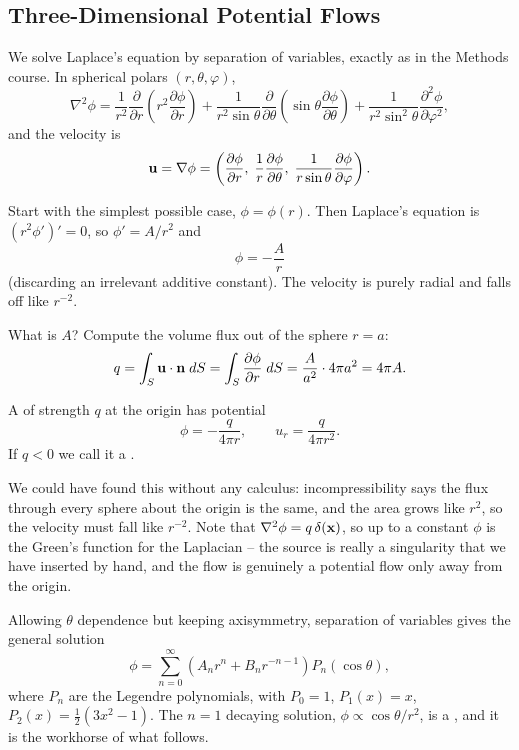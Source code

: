 \documentclass[a4paper]{scrartcl}
\newcommand{\pd}[2]{\frac{\partial #1}{\partial #2}}
\newcommand{\pdd}[2]{\frac{\partial^2 #1}{\partial #2^2}}
\begin{document}
\subsection{Three-Dimensional Potential Flows}

We solve Laplace's equation by separation of variables, exactly as in the Methods course. In spherical polars $(r, \theta, \varphi)$,
$$
\nabla^2 \phi = \frac{1}{r^2}\pd{}{r}\left(r^2 \pd{\phi}{r}\right) + \frac{1}{r^2\sin\theta}\pd{}{\theta}\left(\sin\theta \pd{\phi}{\theta}\right) + \frac{1}{r^2\sin^2\theta}\pdd{\phi}{\varphi},
$$
and the velocity is
$$
\vv u = \nabla \phi = \left(\pd{\phi}{r}, \; \frac{1}{r}\pd{\phi}{\theta}, \; \frac{1}{r\sin\theta}\pd{\phi}{\varphi}\right).
$$

Start with the simplest possible case, $\phi = \phi(r)$. Then Laplace's equation is $(r^2 \phi')' = 0$, so $\phi' = A/r^2$ and
$$
\phi = -\frac{A}{r}
$$
(discarding an irrelevant additive constant). The velocity is purely radial and falls off like $r^{-2}$.

What is $A$? Compute the volume flux out of the sphere $r = a$:
$$
q = \int_S \vv u \cdot \vv n \dd S = \int_S \pd{\phi}{r}\dd S = \frac{A}{a^2}\cdot 4\pi a^2 = 4\pi A.
$$

\begin{definition}
	A  of strength $q$ at the origin has potential
	$$
	\phi = -\frac{q}{4\pi r}, \qquad u_r = \frac{q}{4\pi r^2}.
	$$
	If $q < 0$ we call it a .
\end{definition}

We could have found this without any calculus: incompressibility says the flux through every sphere about the origin is the same, and the area grows like $r^2$, so the velocity must fall like $r^{-2}$. Note that $\nabla^2\phi = q\,\delta(\mathbf{x})$, so up to a constant $\phi$ is the Green's function for the Laplacian -- the source is really a singularity that we have inserted by hand, and the flow is genuinely a potential flow only away from the origin.

Allowing $\theta$ dependence but keeping axisymmetry, separation of variables gives the general solution
$$
\phi = \sum_{n=0}^\infty \left(A_n r^n + B_n r^{-n-1}\right) P_n(\cos\theta),
$$
where $P_n$ are the Legendre polynomials, with $P_0 = 1$, $P_1(x) = x$, $P_2(x) = \tfrac{1}{2}(3x^2 - 1)$. The $n = 1$ decaying solution, $\phi \propto \cos\theta/r^2$, is a , and it is the workhorse of what follows.
\end{document}
